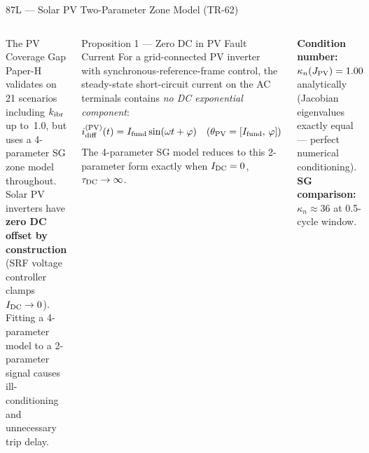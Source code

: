 \documentclass[aspectratio=169, 10pt]{beamer}
\newcommand{\kIBR}{k_{\rm ibr}}
\newcommand{\kn}{\kappa_n}
\begin{document}
\begin{frame}{87L — Solar PV Two-Parameter Zone Model (TR-62)}
\begin{columns}[t]
\begin{block}{The PV Coverage Gap}
\footnotesize
Paper-H validates on 21 scenarios including $\kIBR$ up to~1.0,
but uses a 4-parameter SG zone model throughout.
Solar PV inverters have \textbf{zero DC offset by construction}
(SRF voltage controller clamps $I_{\rm DC} \to 0$).
Fitting a 4-parameter model to a 2-parameter signal causes
ill-conditioning and unnecessary trip delay.
\end{block}
\vspace{5pt}
\begin{block}{Proposition 1 — Zero DC in PV Fault Current}
\footnotesize
For a grid-connected PV inverter with synchronous-reference-frame
control, the steady-state short-circuit current on the AC terminals
contains \emph{no DC exponential component}:
\[
  i_{\rm diff}^{\rm (PV)}(t) = I_{\rm fund}\sin(\omega t + \varphi)
  \quad (\theta_{\rm PV} = [I_{\rm fund},\,\varphi])
\]
The 4-parameter SG model reduces to this 2-parameter form
exactly when $I_{\rm DC} = 0$, $\tau_{\rm DC} \to \infty$.
\end{block}
\vspace{4pt}
\begin{tcolorbox}[keybox]
\footnotesize
\textbf{Condition number:}
$\kn(J_{\rm PV}) = 1.00$ analytically (Jacobian eigenvalues
exactly equal — perfect numerical conditioning).\\
\textbf{SG comparison:} $\kn \approx 36$ at 0.5-cycle window.
\end{tcolorbox}


\end{columns}
\end{frame}
\end{document}
